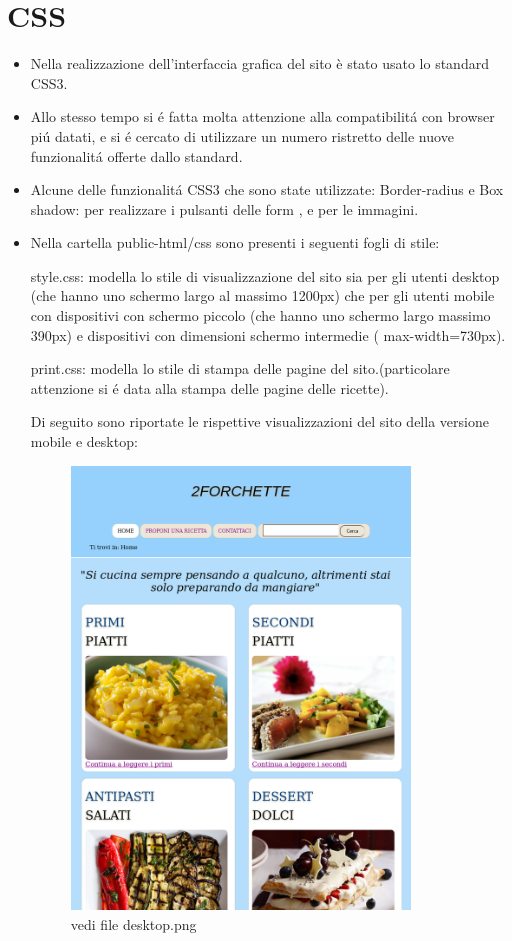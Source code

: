 \documentclass[12pt]{article}
\begin{document}
\section{CSS}
			\begin{itemize}
				\item Nella realizzazione dell'interfaccia grafica del sito è stato usato lo standard CSS3.
				\item Allo stesso tempo si \'e fatta molta attenzione alla compatibilit\'a con browser pi\'u datati, e si \'e cercato di utilizzare un numero ristretto delle nuove funzionalit\'a offerte dallo standard.
				
				\item Alcune delle funzionalit\'a CSS3 che sono state utilizzate:
				Border-radius e Box shadow: per realizzare i pulsanti delle form , e per le immagini.
				
			
				\item Nella cartella public-html/css sono presenti i seguenti fogli di stile:

				\subitem style.css: modella lo stile di visualizzazione del sito sia per gli utenti desktop (che hanno uno schermo largo al massimo 1200px) che per gli utenti mobile con dispositivi con schermo piccolo (che hanno uno schermo largo massimo 390px) e dispositivi con dimensioni schermo intermedie ( max-width=730px).


				\subitem print.css: modella lo stile di stampa delle pagine del sito.(particolare attenzione si \'e data alla stampa delle pagine delle ricette).


					Di seguito sono riportate le rispettive visualizzazioni del sito   della versione mobile e desktop:



			\begin{figure}[ht!]
			\centering
			\includegraphics[width=90mm]{desktop}
			\caption{vedi file desktop.png}
			\end{figure}


\end{itemize}
\end{document}
